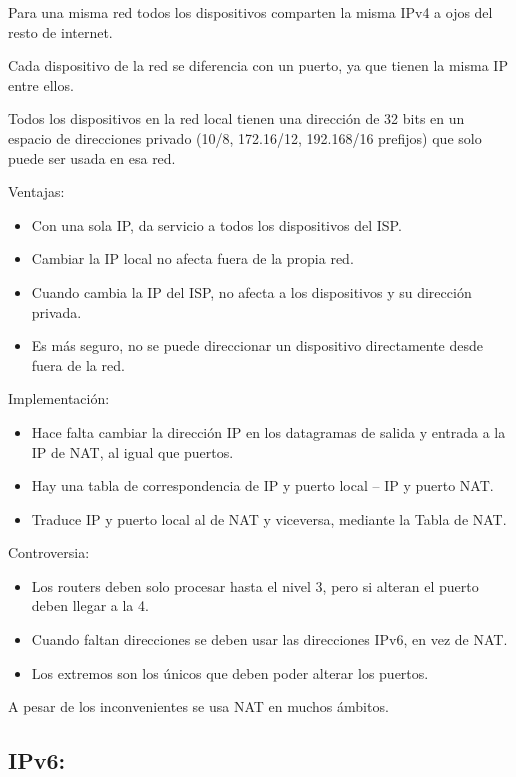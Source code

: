 \documentclass[12pt, twoside, openright]{report} %
\begin{document}
  Para una misma red todos los dispositivos comparten la misma IPv4 a
  ojos del resto de internet.

  Cada dispositivo de la red se diferencia con un puerto, ya que tienen
  la misma IP entre ellos.

  Todos los dispositivos en la red local tienen una dirección de 32 bits
  en un espacio de direcciones privado (10/8, 172.16/12, 192.168/16
  prefijos) que solo puede ser usada en esa red.

  Ventajas:

  \begin{itemize}
  \item
    Con una sola IP, da servicio a todos los dispositivos del ISP.
  \item
    Cambiar la IP local no afecta fuera de la propia red.
  \item
    Cuando cambia la IP del ISP, no afecta a los dispositivos y su
    dirección privada.
  \item
    Es más seguro, no se puede direccionar un dispositivo directamente
    desde fuera de la red.
  \end{itemize}

  Implementación:

  \begin{itemize}
  \item
    Hace falta cambiar la dirección IP en los datagramas de salida y
    entrada a la IP de NAT, al igual que puertos.
  \item
    Hay una tabla de correspondencia de IP y puerto local -- IP y puerto
    NAT.
  \item
    Traduce IP y puerto local al de NAT y viceversa, mediante la Tabla
    de NAT.
  \end{itemize}
\pagebreak
  Controversia:

  \begin{itemize}
  \item
    Los routers deben solo procesar hasta el nivel 3, pero si alteran el
    puerto deben llegar a la 4.
  \item
    Cuando faltan direcciones se deben usar las direcciones IPv6, en vez
    de NAT.
  \item
    Los extremos son los únicos que deben poder alterar los puertos.
  \end{itemize}

  A pesar de los inconvenientes se usa NAT en muchos ámbitos.

  
\subsection{IPv6:}
\end{document}
